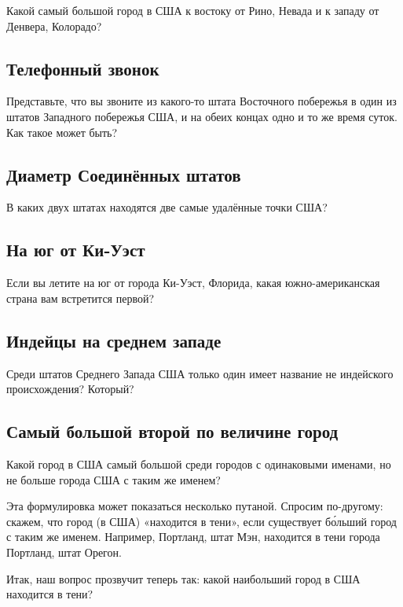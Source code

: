 Какой самый большой город в США к востоку от Рино, Невада и к западу от Денвера, Колорадо? 

\subsection*{Телефонный звонок}%

Представьте, что вы звоните из какого-то штата Восточного побережья в один из штатов Западного побережья США, и на обеих концах одно и то же время суток.
Как такое может быть? 
  

\subsection*{Диаметр Соединённых штатов}%

В каких двух штатах находятся две самые удалённые точки США? 
  

\subsection*{На юг от Ки-Уэст}%

Если вы летите на юг от города Ки-Уэст, Флорида, какая южно-американская страна вам 
встретится первой? 

\subsection*{Индейцы на среднем западе}%

Среди штатов Среднего Запада США только один имеет название не индейского происхождения? Который?    

\subsection*{Самый большой второй по величине город}%

Какой город в США самый большой среди городов с одинаковыми именами, но не больше города США с таким же именем?

\medskip

Эта формулировка может показаться несколько путаной.
Спросим по-другому: скажем, что город (в США) «находится в тени», если существует б\'{о}льший город с таким же именем.
Например, Портланд, штат Мэн, находится в тени города Портланд, штат Орегон.

Итак, наш вопрос прозвучит теперь так: какой наибольший город в США находится в тени?   

